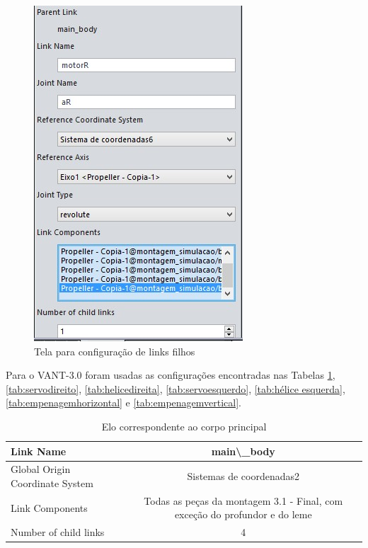 \begin{figure}[!htb]%
\centering %
\includegraphics[scale=01]{Imagens/motorR.jpg} %
\caption{Tela para configuração de links filhos} %
\end{figure} %

Para o VANT-3.0 foram usadas as configurações encontradas nas Tabelas \ref{tab:mainbody}, \ref{tab:servodireito}, \ref{tab:helicedireita}, \ref{tab:servoesquerdo}, \ref{tab:hélice esquerda}, \ref{tab:empenagemhorizontal} e \ref{tab:empenagemvertical}.


\begin{table}[htbp]
\centering
\begin{tabular}{|l|cccc|}
\hline
Link Name & \multicolumn{4}{c|}{ main\textbackslash{}\_body} \\
\hline
Global Origin Coordinate System  & \multicolumn{4}{c|}{Sistemas de coordenadas2} \\
\hline
\multicolumn{1}{|p{14.715em}|}{Link Components } & \multicolumn{4}{p{18.36em}|}{Todas as peças da montagem 3.1 - Final, com exceção do profundor e do leme} \\
\hline
Number of child links & \multicolumn{4}{c|}{4} \\
\hline
\end{tabular}%
\caption{Elo correspondente ao corpo principal}
\label{tab:mainbody}%
\end{table}%

